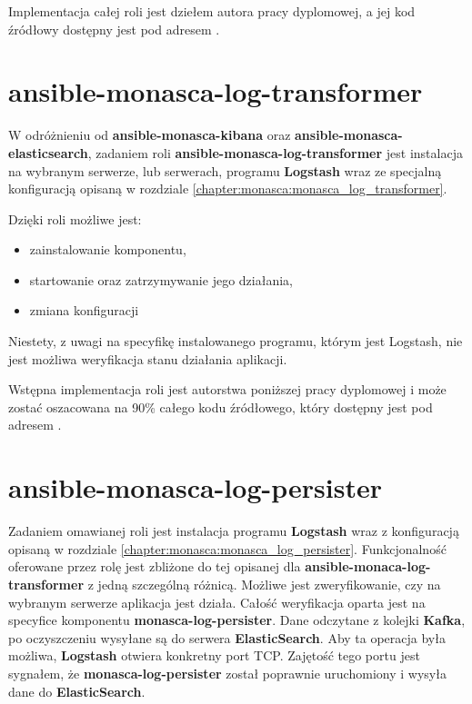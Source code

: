     Implementacja całej roli jest dziełem autora pracy dyplomowej, a jej kod źródłowy dostępny
    jest pod adresem .

\section{ansible-monasca-log-transformer}
\label{chapter:application:own_work:ansible_log_transformer}

    W odróżnieniu od \textbf{ansible-monasca-kibana} oraz \textbf{ansible-monasca-elasticsearch}, zadaniem roli
    \textbf{ansible-monasca-log-transformer} jest instalacja na wybranym serwerze, lub serwerach, programu
    \textbf{Logstash} wraz ze specjalną konfiguracją opisaną w rozdziale \ref{chapter:monasca:monasca_log_transformer}.
    
    Dzięki roli możliwe jest:
    \begin{itemize}
        \item zainstalowanie komponentu,
        \item startowanie oraz zatrzymywanie jego działania,
        \item zmiana konfiguracji
    \end{itemize}
    
    Niestety, z uwagi na specyfikę instalowanego programu, którym jest Logstash, nie jest możliwa weryfikacja stanu
    działania aplikacji.
    
    Wstępna implementacja roli jest autorstwa poniższej pracy dyplomowej i może zostać oszacowana na 90\% całego
    kodu źródłowego, który dostępny jest pod adresem
    .

\section{ansible-monasca-log-persister}
\label{chapter:application:own_work:ansible_log_persister}

    Zadaniem omawianej roli jest instalacja programu \textbf{Logstash} wraz z konfiguracją opisaną
    w rozdziale \ref{chapter:monasca:monasca_log_persister}. Funkcjonalność oferowane przez rolę jest
    zbliżone do tej opisanej dla \textbf{ansible-monaca-log-transformer} z jedną szczególną różnicą.
    Możliwe jest zweryfikowanie, czy na wybranym serwerze aplikacja jest działa. Całość weryfikacja oparta jest
    na specyfice komponentu \textbf{monasca-log-persister}. Dane odczytane z kolejki \textbf{Kafka}, po oczyszczeniu
    wysyłane są do serwera \textbf{ElasticSearch}. Aby ta operacja była możliwa, \textbf{Logstash} otwiera konkretny
    port TCP. Zajętość tego portu jest sygnałem, że \textbf{monasca-log-persister} został poprawnie uruchomiony i wysyła
    dane do \textbf{ElasticSearch}.

